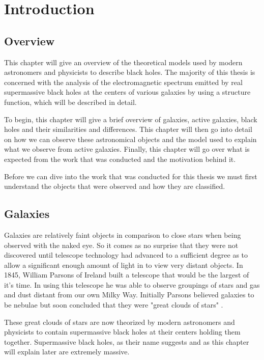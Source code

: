 \documentclass[12pt, oneside]{smuthesis}
\begin{document}
\chapter{\sc Introduction} \label{introduction}

\section{\sc Overview} \label{overview}

This chapter will give an overview of the theoretical models used by modern astronomers and physicists to describe black holes. The majority of this thesis is concerned with the analysis of the electromagnetic spectrum emitted by real supermassive black holes at the centers of various galaxies by using a structure function, which will be described in detail.

To begin, this chapter will give a brief overview of galaxies, active galaxies, black holes and their similarities and differences. This chapter will then go into detail on how we can observe these astronomical objects and the model used to explain what we observe from active galaxies. Finally, this chapter will go over what is expected from the work that was conducted and the motivation behind it.

Before we can dive into the work that was conducted for this thesis we must first understand the objects that were observed and how they are classified.

\section{\sc Galaxies} \label{galaxies}

Galaxies are relatively faint objects in comparison to close stars when being observed with the naked eye. So it comes as no surprise that they were not discovered until telescope technology had advanced to a sufficient degree as to allow a significant enough amount of light in to view very distant objects. In 1845, William Parsons of Ireland built a telescope that would be the largest of it's time. In using this telescope he was able to observe groupings of stars and gas and dust distant from our own Milky Way. Initially Parsons believed galaxies to be nebulae but soon concluded that they were "great clouds of stars" \cite{sag}.

These great clouds of stars are now theorized by modern astronomers and physicists to contain supermassive black holes at their centers holding them together. Supermassive black holes, as their name suggests and as this chapter will explain later are extremely massive.
\end{document}
